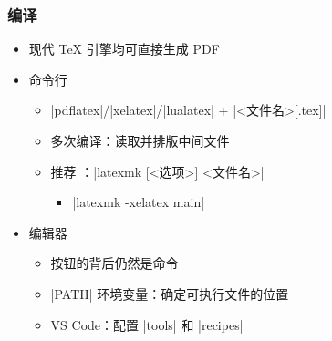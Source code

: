 \begin{frame}[fragile]
\frametitle{编译}
\begin{itemize}
\item 现代 \TeX{} 引擎均可直接生成 PDF \pause
\item 命令行

    \begin{itemize}
    \item |pdflatex|/|xelatex|/|lualatex| + |<文件名>[.tex]|
    \item 多次编译：读取并排版中间文件 \pause
    \item 推荐 ：|latexmk [<选项>] <文件名>|

        \begin{itemize}
        \item |latexmk -xelatex main|
        \end{itemize}
    \end{itemize} \pause

\item 编辑器

    \begin{itemize}
    \item 按钮的背后仍然是命令
    \item |PATH| 环境变量：确定可执行文件的位置
    \item VS Code：配置 |tools| 和 |recipes|
    \end{itemize}
\end{itemize}
\end{frame}
